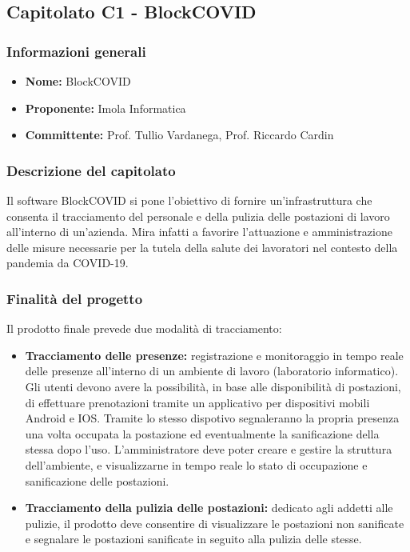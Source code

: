 \subsection{Capitolato C1 - BlockCOVID}


\subsubsection{Informazioni generali}

\begin{itemize}
	\item{\textbf{Nome:}} BlockCOVID
	\item{\textbf{Proponente:}} Imola Informatica
	\item{\textbf{Committente:}} Prof. Tullio Vardanega, Prof. Riccardo Cardin
\end{itemize}



\subsubsection{Descrizione del capitolato}

Il software BlockCOVID si pone l'obiettivo di fornire un'infrastruttura che consenta il tracciamento del personale e della pulizia delle postazioni di lavoro all'interno di un'azienda. Mira infatti a favorire l'attuazione e amministrazione delle misure necessarie per la tutela della salute dei lavoratori nel contesto della pandemia da COVID-19.



\subsubsection{Finalità del progetto}

Il prodotto finale prevede due modalità di tracciamento:
\begin{itemize}
	\item{\textbf{Tracciamento delle presenze:}} registrazione e monitoraggio in tempo reale delle presenze all'interno di un ambiente di lavoro (laboratorio informatico). Gli utenti devono avere la possibilità, in base alle disponibilità di postazioni, di effettuare prenotazioni tramite un applicativo per dispositivi mobili Android e IOS. Tramite lo stesso dispotivo segnaleranno la propria presenza una volta occupata la postazione ed eventualmente la sanificazione della stessa dopo l'uso. L'amministratore deve poter creare e gestire la struttura dell'ambiente, e visualizzarne in tempo reale lo stato di occupazione e sanificazione delle postazioni. 
	\item{\textbf{Tracciamento della pulizia delle postazioni:}} dedicato agli addetti alle pulizie, il prodotto deve consentire di visualizzare le postazioni non sanificate e segnalare le postazioni sanificate in seguito alla pulizia delle stesse.
\end{itemize}



